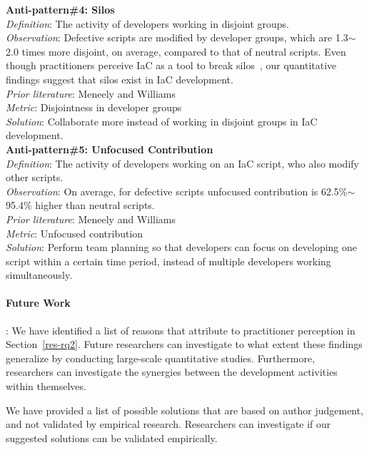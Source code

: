 \documentclass[smallextended]{svjour3}       %
\begin{document}
\begin{shaded}
\hspace{-0.65cm}\textbf{Anti-pattern\#4: Silos} \\
\textit{Definition}: The activity of developers working in disjoint groups. \\ 
\textit{Observation}:  Defective scripts are modified by developer groups, which are 1.3$\mathtt{\sim}$2.0 times more disjoint, on average, compared to that of neutral scripts. Even though practitioners perceive IaC as a tool to break silos~\citep{silo:iac:devops}, our quantitative findings suggest that silos exist in IaC development. \\ 
\textit{Prior literature}: Meneely and Williams~\citep{Meneely:Linus}  \\
\textit{Metric}: Disjointness in developer groups \\
\textit{Solution}: Collaborate more instead of working in disjoint groups in IaC development. \\


\hspace{-0.6cm} \textbf{Anti-pattern\#5: Unfocused Contribution} \\
\textit{Definition}: The activity of developers working on an IaC script, who also modify other scripts. \\ 
\textit{Observation}:  On average, for defective scripts unfocused contribution is 62.5\%$\mathtt{\sim}$95.4\% higher than neutral scripts.   \\ 
\textit{Prior literature}: Meneely and Williams~\citep{Meneely:Linus}  \\
\textit{Metric}: Unfocused contribution \\
\textit{Solution}: Perform team planning so that developers can focus on developing one script within a certain time period, instead of multiple developers working simultaneously. \\
\end{shaded} 

\paragraph{Future Work}: We have identified a list of reasons that attribute to practitioner perception in Section~\ref{res-rq2}. Future researchers can investigate to what extent these findings generalize by conducting large-scale quantitative studies. Furthermore, researchers can investigate the synergies between the development activities within themselves.

We have provided a list of possible solutions that are based on author judgement, and not validated by empirical research. Researchers can investigate if our suggested solutions can be validated empirically.   
\end{document}
